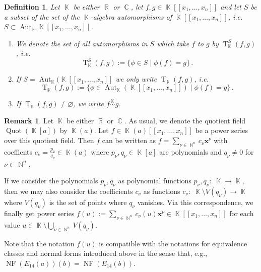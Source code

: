 \documentclass[noend]{amsproc}
\newtheorem{defn}[theorem]{Definition}
\theoremstyle{definition}
\newtheorem{remark}[theorem]{Remark}
\newcommand{\NF}[1]{\operatorname{NF}(#1)}
\DeclareMathOperator{\N}{\mathbb{N}}
\DeclareMathOperator{\R}{\mathbb{R}}
\DeclareMathOperator{\C}{\mathbb{C}}
\DeclareMathOperator{\K}{\mathbb{K}}
\DeclareMathOperator{\T}{T}
\DeclareMathOperator{\Aut}{Aut}
\DeclareMathOperator{\Quot}{Quot}
\begin{document}
\begin{defn}
Let $\K$ be either $\R$ or $\C$, let $f,g\in\K[[x_1, \ldots, x_n]]$ and let $S$ be a subset of the set of the $\K$-algebra automorphisms
of $\K[[x_1, \ldots, x_n]]$, i.e.~$S\subset\Aut_{\K}\K[[x_1,\ldots,x_n]]$. 
\begin{enumerate}
\item We denote the set of all automorphisms in $S$ which take $f$ to $g$ by $\T_{\K}^S(f,g)$, i.e.\@
\[
\T_{\K}^S(f,g):=\{\phi\in S\mid \phi(f)=g\}\,.
\]
\item If $S=\Aut_{\K}(\K[[x_1,\ldots,x_n]]$ we only write $\T_{\K}(f,g)$, i.e.\@
\[
\T_{\K}(f,g)
:= \{\phi \in \Aut_{\K}(\K[[x_1, \ldots, x_n]]) \mid \phi(f) = g \} \,.
\]
\item If $\T_{\K}(f,g)\neq\varnothing$, we write $f\overset{\K}\sim g$.
\end{enumerate}
\end{defn}

\begin{remark}
Let $\K$ be either $\R$ or $\C$. As usual, we denote the quotient field
$\Quot(\K[a])$ by $\K(a)$. Let $f \in \K(a)[[x_1,\ldots,x_n]]$ be a power
series over this quotient field. Then $f$ can be written as
$f = \sum_{\nu \in \N^n} c_\nu \boldsymbol{x}^\nu$ with coeffients
$c_\nu = \frac{p_\nu}{q_\nu} \in \K(a)$ where $p_\nu, q_\nu \in \K[a]$ are
polynomials and $q_\nu \neq 0$ for $\nu \in \N^n$.

If we consider the polynomials $p_\nu, q_\nu$ as polynomial functions
$p_\nu, q_\nu: \; \K \rightarrow \K$, then we may also consider the
coefficients $c_\nu$ as functions
$c_\nu: \; \K \setminus V(q_\nu) \rightarrow \K$ where $V(q_\nu)$ is the set of
points where $q_\nu$ vanishes. Via this correspondence, we finally get power
series
$f(u) := \sum_{\nu \in \N^n} c_\nu(u) \boldsymbol{x}^\nu
\in \K[[x_1,\ldots,x_n]]$ for each value
$u \in \K \setminus \bigcup_{\nu \in \N^n} V(q_\nu)$.

Note that the notation $f(u)$ is compatible with the notations for equivalence
classes and normal forms introduced above in the sense that, e.g.,
$\NF{E_{14}(a)}(b) = \NF{E_{14}(b)}$.
\end{remark}
\end{document}
